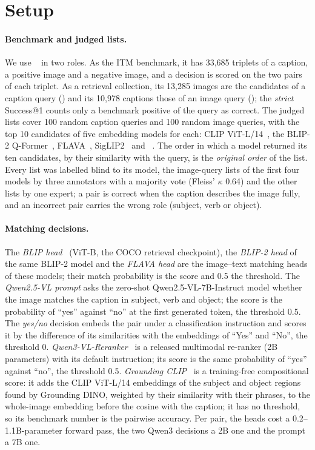 \section{Setup}
\label{sec:protocol}

\paragraph{Benchmark and judged lists.}
We use \svo{}~\cite{hendricks2021probing} in two roles. As the ITM benchmark, it has 33,685 triplets of a caption, a positive image and a negative image, and a decision is scored on the two pairs of each triplet. As a retrieval collection, its 13,285 images are the candidates of a caption query (\ttoi{}) and its 10,978 captions those of an image query (\itot{}); the \emph{strict} Success@1 counts only a benchmark positive of the query as correct. The judged lists cover 100 random caption queries and 100 random image queries, with the top 10 candidates of five embedding models for each: CLIP ViT-L/14~\cite{radford2021learning}, the BLIP-2 Q-Former~\cite{li2023blip2}, FLAVA~\cite{singh2022flava}, SigLIP2~\cite{tschannen2025siglip2} and \qemb{}~\cite{qwen3vlembedding2026}. The order in which a model returned its ten candidates, by their similarity with the query, is the \emph{original order} of the list. Every list was labelled blind to its model, the image-query lists of the first four models by three annotators with a majority vote (Fleiss' $\kappa$ 0.64) and the other lists by one expert; a pair is correct when the caption describes the image fully, and an incorrect pair carries the wrong role (subject, verb or object).

\paragraph{Matching decisions.}
The \emph{BLIP head}~\cite{li2022blip} (ViT-B, the COCO retrieval checkpoint), the \emph{BLIP-2 head} of the same BLIP-2 model and the \emph{FLAVA head} are the image--text matching heads of these models; their match probability is the score and 0.5 the threshold. The \emph{Qwen2.5-VL prompt} asks the zero-shot Qwen2.5-VL-7B-Instruct model whether the image matches the caption in subject, verb and object; the score is the probability of ``yes'' against ``no'' at the first generated token, the threshold 0.5. The \emph{\qemb{} yes/no} decision embeds the pair under a classification instruction and scores it by the difference of its similarities with the embeddings of ``Yes'' and ``No'', the threshold 0. \emph{Qwen3-VL-Reranker}~\cite{qwen3vlembedding2026} is a released multimodal re-ranker (2B parameters) with its default instruction; its score is the same probability of ``yes'' against ``no'', the threshold 0.5. \emph{Grounding CLIP}~\cite{vongala2025compositional} is a training-free compositional score: it adds the CLIP ViT-L/14 embeddings of the subject and object regions found by Grounding DINO, weighted by their similarity with their phrases, to the whole-image embedding before the cosine with the caption; it has no threshold, so its benchmark number is the pairwise accuracy. Per pair, the heads cost a 0.2--1.1B-parameter forward pass, the two Qwen3 decisions a 2B one and the prompt a 7B one.

